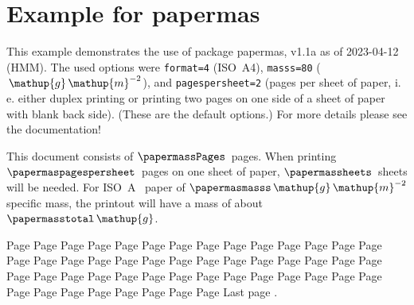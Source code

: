 \documentclass[british,a4paper]{article}[2022/07/02]%
\DeclareRobustCommand{\unit}[1]{\ensuremath{\mathord{\thinspace\mathup{#1}}}}
\begin{document}
\section*{Example for papermas}

This example demonstrates the use of package\newline
\textsf{papermas}, v1.1a as of 2023-04-12 (HMM).\newline
The used options were \texttt{format=4} (ISO~A4),
\texttt{masss=80} ($\unit{g}\unit{m}^{-2}$), and\newline
\texttt{pagespersheet=2} (pages per sheet of paper,
i.\,e. either duplex printing or\newline
printing two pages on one side of a sheet of paper with blank back side).\newline
(These are the default options.)\newline
For more details please see the documentation!
\bigskip

This document consists of $\papermassPages$~pages.
When printing $\papermaspagespersheet$~pages on one sheet of paper,
$\papermassheets$~sheets will be needed. For ISO~A~\papermasformat{}
paper of $\papermasmasss \unit{g}\unit{m}^{-2}$ specific mass,
the printout will have a mass of about $\papermasstotal \unit{g}$.

\newpage Page \thepage\newpage Page \thepage\newpage Page \thepage\newpage Page \thepage\newpage Page \thepage
\newpage Page \thepage\newpage Page \thepage\newpage Page \thepage\newpage Page \thepage\newpage Page \thepage
\newpage Page \thepage\newpage Page \thepage\newpage Page \thepage\newpage Page \thepage\newpage Page \thepage
\newpage Page \thepage\newpage Page \thepage\newpage Page \thepage\newpage Page \thepage\newpage Page \thepage
\newpage Page \thepage\newpage Page \thepage\newpage Page \thepage\newpage Page \thepage\newpage Page \thepage
\newpage Page \thepage\newpage Page \thepage\newpage Page \thepage\newpage Page \thepage\newpage Page \thepage
\newpage Page \thepage\newpage Page \thepage\newpage Page \thepage\newpage Page \thepage\newpage Page \thepage
\newpage Page \thepage\newpage Page \thepage\newpage Page \thepage\newpage Page \thepage\newpage Page \thepage
\newpage Page \thepage\newpage Page \thepage\newpage Page \thepage\newpage Page \thepage\newpage Page \thepage
\newpage Page \thepage\newpage Page \thepage\newpage Page \thepage\newpage Page \thepage\newpage Page \thepage
\newpage Last page \thepage.
\end{document}
